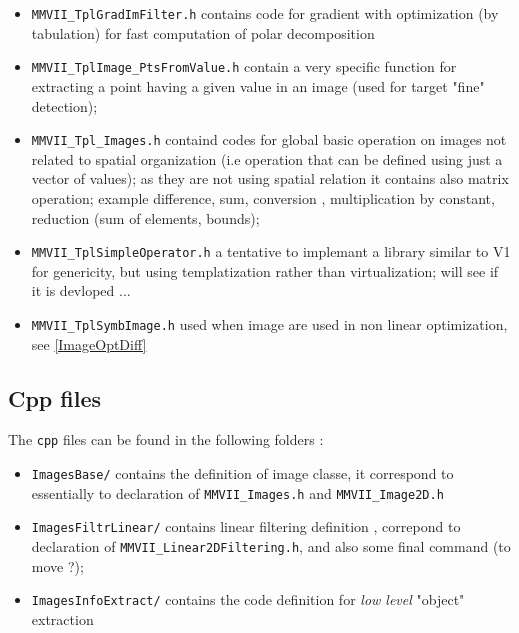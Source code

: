 \begin{itemize}
	\item {\tt MMVII\_TplGradImFilter.h} contains code for gradient with optimization
		(by tabulation) for fast computation of polar decomposition 

        \item {\tt MMVII\_TplImage\_PtsFromValue.h} contain a very specific function for extracting
	      a point having a given value in an image (used for target "fine" detection);

      \item {\tt MMVII\_Tpl\_Images.h} containd codes for global basic operation on images not
	      related to spatial organization  (i.e operation that can be defined using just
		a vector of values); as they are not using spatial relation it contains also matrix
		operation; example  difference, sum, conversion , multiplication by constant,  reduction
		(sum of elements, bounds); 

	\item {\tt MMVII\_TplSimpleOperator.h} a tentative to implemant a library similar to V1 for genericity,
		but using templatization rather than virtualization; will see if it is devloped ...
	
	\item {\tt MMVII\_TplSymbImage.h} used when image are used in non linear optimization, see \ref{ImageOptDiff}

\end{itemize}


\subsection{Cpp files}

The {\tt cpp} files can be found in the following folders :

\begin{itemize}
     \item {\tt ImagesBase/} contains the definition of image classe, it correspond to 
	     essentially to declaration of {\tt MMVII\_Images.h} and {\tt MMVII\_Image2D.h} 

     \item {\tt ImagesFiltrLinear/} contains linear filtering definition , correpond to declaration of
	     {\tt MMVII\_Linear2DFiltering.h}, and also some final command (to move ?);

     \item {\tt ImagesInfoExtract/}  contains the code definition for \emph{low level} "object" extraction
\end{itemize}

